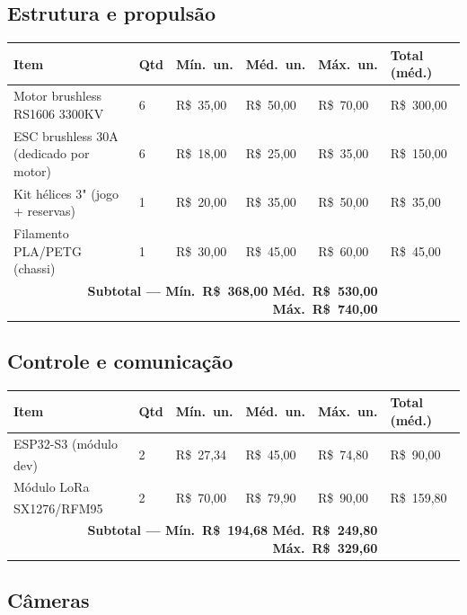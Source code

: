 \documentclass[11pt,a4paper]{article}
\newcommand{\pesq}{\textsuperscript{\textdagger}}
\begin{document}
\subsection{Estrutura e propulsão}

\begin{longtable}{@{}p{5.4cm}p{0.9cm}p{1.7cm}p{1.7cm}p{1.7cm}p{2.1cm}@{}}
\toprule
\textbf{Item} & \textbf{Qtd} & \textbf{Mín.\ un.} & \textbf{Méd.\ un.} & \textbf{Máx.\ un.} & \textbf{Total (méd.)} \\
\midrule
\endhead
\bottomrule
\endfoot
Motor brushless RS1606 3300KV & 6 & R\$~35,00 & R\$~50,00 & R\$~70,00 & R\$~300,00 \\
ESC brushless 30A (dedicado por motor) & 6 & R\$~18,00 & R\$~25,00 & R\$~35,00 & R\$~150,00 \\
Kit hélices 3" (jogo + reservas) & 1 & R\$~20,00 & R\$~35,00 & R\$~50,00 & R\$~35,00 \\
Filamento PLA/PETG (chassi) & 1 & R\$~30,00 & R\$~45,00 & R\$~60,00 & R\$~45,00 \\
\midrule
\multicolumn{5}{r}{\textbf{Subtotal — Mín.\ R\$~368,00 \quad Méd.\ R\$~530,00 \quad Máx.\ R\$~740,00}} & \\
\end{longtable}

\subsection{Controle e comunicação}

\begin{longtable}{@{}p{5.4cm}p{0.9cm}p{1.7cm}p{1.7cm}p{1.7cm}p{2.1cm}@{}}
\toprule
\textbf{Item} & \textbf{Qtd} & \textbf{Mín.\ un.} & \textbf{Méd.\ un.} & \textbf{Máx.\ un.} & \textbf{Total (méd.)} \\
\midrule
\endhead
\bottomrule
\endfoot
ESP32-S3 (módulo dev)\pesq & 2 & R\$~27,34 & R\$~45,00 & R\$~74,80 & R\$~90,00 \\
Módulo LoRa SX1276/RFM95\pesq & 2 & R\$~70,00 & R\$~79,90 & R\$~90,00 & R\$~159,80 \\
\midrule
\multicolumn{5}{r}{\textbf{Subtotal — Mín.\ R\$~194,68 \quad Méd.\ R\$~249,80 \quad Máx.\ R\$~329,60}} & \\
\end{longtable}

\subsection{Câmeras}
\end{document}
